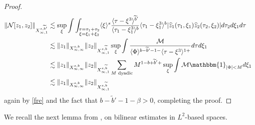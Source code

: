 \documentclass[%
11pt,  reqno]{amsart}
\newcommand{\jap}[1]{\langle #1 \rangle}
\newcommand{\5}{\textup{V}}
\newcommand{\ft}{\widehat}
\newcommand{\wt}{\widetilde}
\theoremstyle{remark}
\newcommand{\jb}[1]
{\langle #1 \rangle}
\numberwithin{equation}{section}
\numberwithin{theorem}{section}
\newcommand{\Ncal}{\mathcal{N}}
\begin{document}
\begin{proof}
			\begin{align}
				\|\Ncal[z_1,z_2]\|_{X^{s,\wt{b}'}_{\infty,1}} 
&
\lesssim \sup_\xi \int \int_{\substack{\tau=\tau_1+\tau_2\\ \xi=\xi_1+\xi_2}} 
\jb{\xi}^s \frac{\jap{\tau-\xi^3}^{\wt{b}'}}{\jap{\tau_1-\xi_1^3}^b} \jap{\tau_1-\xi_1^3}^b
|\ft{z}_1(\tau_1, \xi_1)
\ft{z}_2(\tau_2, \xi_2)
|
 d\tau_2 d\xi_1 d\tau
 \\
&
\lesssim 
\|z_1\|_{X^{s,b}_{\infty,\infty}} \|z_2\|_{X^{s,\wt{b}}_{\infty,1}} 
\sup_\xi \int \frac{\mathcal{M}}{\jap{\Phi}^{b-\wt{b}'-1-}\jap{\tau-\xi^3}^{1+} } d\tau d\xi_1 
\\
&
\lesssim 
\|z_1\|_{X^{s,b}_{\infty,\infty}} \|z_2\|_{X^{s,\wt{b}}_{\infty,1}} 
\sum_{M \text{ dyadic}} M^{1-b+\wt{b}'+} \sup_\xi \int \mathcal{M} \mathbbm{1}_{|\Phi|<M} d\xi_1
\\
&
 \lesssim\|z_1\|_{X^{s,b}_{\infty,\infty}}  \|z_2\|_{X^{s,\wt{b}}_{\infty,1}}
			\end{align}
			again by \eqref{fre} and the fact that $b-\wt{b}'-1-\beta>0$, completing the proof. 
		\end{proof}
		


We recall the next lemma from \cite{CLS}, on bilinear estimates in $L^2$-based spaces. 
\end{document}
